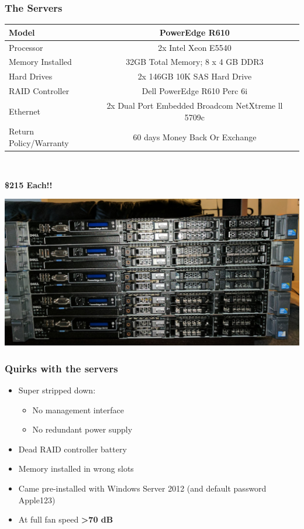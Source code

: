 \documentclass[aspectratio=169,11pt,hyperref={colorlinks=true}]{beamer}
\begin{document}
\begin{frame}
    \frametitle{The Servers}
    \begin{tabular}{ l c r }
        \hline
        Model &	PowerEdge R610 \\
        \hline
        Processor &	2x Intel Xeon E5540 \\
        \hline
        Memory Installed & 32GB Total Memory; 8 x 4 GB DDR3 \\
        \hline
        Hard Drives & 2x 146GB 10K SAS Hard Drive \\
        \hline
        RAID Controller & Dell PowerEdge R610 Perc 6i \\
        \hline
        Ethernet & 2x Dual Port Embedded Broadcom NetXtreme ll 5709c \\
        \hline
        Return Policy/Warranty & 60 days Money Back Or Exchange \\
        \hline
    \end{tabular}
    \\
    \begin{center}
        \Huge{\textbf{\$215 Each!!}}
    \end{center}
\end{frame}

\begin{frame}
    \includegraphics[width=\textwidth]{servers_delivered.jpg}  
\end{frame}

\begin{frame}
    \frametitle{Quirks with the servers}
    \begin{itemize}
        \item Super stripped down:
            \begin{itemize}
                \item No management interface
                \item No redundant power supply
            \end{itemize}
        \item Dead RAID controller battery
        \item Memory installed in wrong slots
        \item Came pre-installed with Windows Server 2012 (and default password Apple123)
        \item At full fan speed \textbf{>70 dB}
    \end{itemize}
\end{frame}
\end{document}
